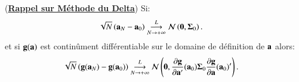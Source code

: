 \documentclass[10pt, reqno]{amsart}
\begin{document}
\begin{enumerate}
\begin{enumerate}
    \begin{remarque}(\textbf{\underline{Rappel sur Méthode du Delta}})
        Si:
        \begin{align*}
            \sqrt{N}\left({\mathbf a}_N - {\mathbf a}_0\right)&\overset{L}{\underset{N\rightarrow +\infty}{\longrightarrow}} \mathcal{N}\left({\mathbf 0}, {\boldsymbol \Sigma}_0\right).
        \end{align*}
        et si ${\mathbf g}({\mathbf a})$ est continûment différentiable sur le domaine de définition de ${\mathbf a}$ alors:
\begin{align*}
    \sqrt{N}\left({\mathbf g}({\mathbf a}_N)-{\mathbf g}({\mathbf a}_0)\right)&\overset{L}{\underset{N\rightarrow +\infty}{\longrightarrow}}
     \mathcal{N}\left({\mathbf 0}, 
    \frac{\partial \bold g}{\partial {\mathbf a}^\prime}({\mathbf a}_0){\boldsymbol \Sigma}_0 \frac{\partial \bold g}{\partial {\mathbf a}}({\mathbf a}_0)^\prime\right).
\end{align*}
    \end{remarque}
\end{enumerate}
\end{enumerate}

\newpage



%
%
 
\end{document}
